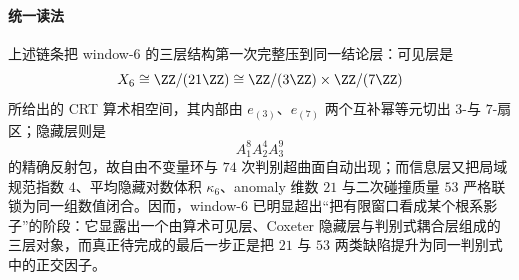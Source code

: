 \paragraph{统一读法}
上述链条把 window-\(6\) 的三层结构第一次完整压到同一结论层：可见层是
\[
X_6\cong \ZZ/(21\ZZ)\cong \ZZ/(3\ZZ)\times \ZZ/(7\ZZ)
\]
所给出的 CRT 算术相空间，其内部由 \(e_{(3)}\)、\(e_{(7)}\) 两个互补幂等元切出 \(3\)-与 \(7\)-扇区；隐藏层则是
\[
A_1^8A_2^4A_3^9
\]
的精确反射包，故自由不变量环与 \(74\) 次判别超曲面自动出现；而信息层又把局域规范指数 \(4\)、平均隐藏对数体积 \(\kappa_6\)、anomaly 维数 \(21\) 与二次碰撞质量 \(53\) 严格联锁为同一组数值闭合。因而，window-\(6\) 已明显超出“把有限窗口看成某个根系影子”的阶段：它显露出一个由算术可见层、Coxeter 隐藏层与判别式耦合层组成的三层对象，而真正待完成的最后一步正是把 \(21\) 与 \(53\) 两类缺陷提升为同一判别式中的正交因子。

\endinput

